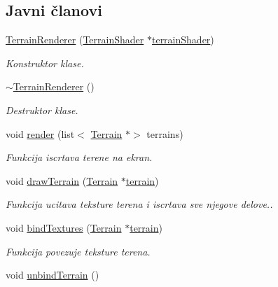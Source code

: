 \subsection*{Javni članovi}
\begin{DoxyCompactItemize}
\item 
\hyperlink{classcore_1_1TerrainRenderer_aef52c32054bf2be3fc5ec160a2d7433b}{Terrain\+Renderer} (\hyperlink{classshader_1_1TerrainShader}{Terrain\+Shader} $\ast$\hyperlink{classcore_1_1TerrainRenderer_a6db721ffef6f7175977ad243b4ac2834}{terrain\+Shader})
\begin{DoxyCompactList}\small\item\em Konstruktor klase. \end{DoxyCompactList}\item 
\hyperlink{classcore_1_1TerrainRenderer_a18e79e2c14c4f2196d410bbde7b85060}{$\sim$\+Terrain\+Renderer} ()
\begin{DoxyCompactList}\small\item\em Destruktor klase. \end{DoxyCompactList}\item 
void \hyperlink{classcore_1_1TerrainRenderer_a1f2aaf851e780fc8f78aa5bb3cd1b512}{render} (list$<$ \hyperlink{classterrain_1_1Terrain}{Terrain} $\ast$$>$ terrains)
\begin{DoxyCompactList}\small\item\em Funkcija iscrtava terene na ekran. \end{DoxyCompactList}\item 
void \hyperlink{classcore_1_1TerrainRenderer_aa81fb29d5ab446955ffc1aae79514d8a}{draw\+Terrain} (\hyperlink{classterrain_1_1Terrain}{Terrain} $\ast$\hyperlink{namespacecore_ac45da6f80dac9bead5c9310c27897f15}{terrain})
\begin{DoxyCompactList}\small\item\em Funkcija ucitava teksture terena i iscrtava sve njegove delove.. \end{DoxyCompactList}\item 
void \hyperlink{classcore_1_1TerrainRenderer_ac66bf45a30d7c1b443f8b77132112fe0}{bind\+Textures} (\hyperlink{classterrain_1_1Terrain}{Terrain} $\ast$\hyperlink{namespacecore_ac45da6f80dac9bead5c9310c27897f15}{terrain})
\begin{DoxyCompactList}\small\item\em Funkcija povezuje teksture terena. \end{DoxyCompactList}\item 
void \hyperlink{classcore_1_1TerrainRenderer_ac739a96169a8fef7bfad56bbe3367962}{unbind\+Terrain} ()
$$
\end{DoxyCompactItemize}

